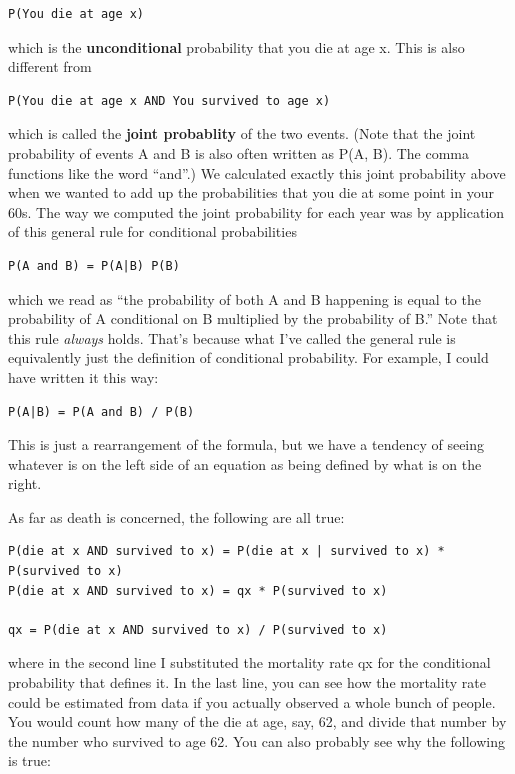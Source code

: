 \documentclass[
  openany]{book}
\begin{document}
\begin{verbatim}
P(You die at age x)
\end{verbatim}

which is the \textbf{unconditional} probability that you die at age x. This is also different from

\begin{verbatim}
P(You die at age x AND You survived to age x)
\end{verbatim}

which is called the \textbf{joint probablity} of the two events. (Note that the joint probability of events A and B is also often written as P(A, B). The comma functions like the word ``and''.) We calculated exactly this joint probability above when we wanted to add up the probabilities that you die at some point in your 60s. The way we computed the joint probability for each year was by application of this general rule for conditional probabilities

\begin{verbatim}
P(A and B) = P(A|B) P(B)
\end{verbatim}

which we read as ``the probability of both A and B happening is equal to the probability of A conditional on B multiplied by the probability of B.'' Note that this rule \emph{always} holds. That's because what I've called the general rule is equivalently just the definition of conditional probability. For example, I could have written it this way:

\begin{verbatim}
P(A|B) = P(A and B) / P(B)
\end{verbatim}

This is just a rearrangement of the formula, but we have a tendency of seeing whatever is on the left side of an equation as being defined by what is on the right.

As far as death is concerned, the following are all true:

\begin{verbatim}
P(die at x AND survived to x) = P(die at x | survived to x) * P(survived to x)
P(die at x AND survived to x) = qx * P(survived to x)

qx = P(die at x AND survived to x) / P(survived to x)
\end{verbatim}

where in the second line I substituted the mortality rate qx for the conditional probability that defines it. In the last line, you can see how the mortality rate could be estimated from data if you actually observed a whole bunch of people. You would count how many of the die at age, say, 62, and divide that number by the number who survived to age 62. You can also probably see why the following is true:
\end{document}
